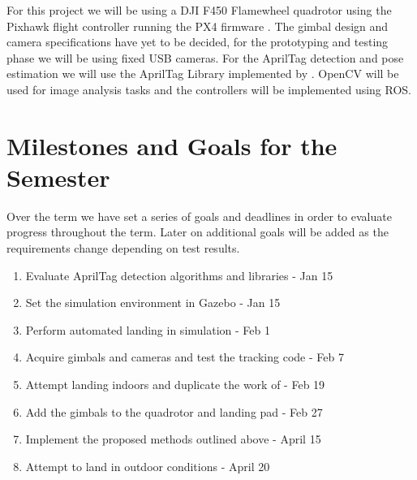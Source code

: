 \documentclass{article}[12pt]
\begin{document}
For this project we will be using a DJI F450 Flamewheel quadrotor using the Pixhawk flight controller \cite{pixhawk} running the PX4 firmware \cite{px4}. The gimbal design and camera specifications have yet to be decided, for the prototyping and testing phase we will be using fixed USB cameras. For the AprilTag detection and pose estimation we will use the AprilTag Library implemented by \cite{apriltags}. OpenCV will be used for image analysis tasks and the controllers will be implemented using ROS. 


\section*{Milestones and Goals for the Semester}
Over the term we have set a series of goals and deadlines in order to evaluate progress throughout the term. Later on additional goals will be added as the requirements change depending on test results.
\begin{enumerate}
	\item{Evaluate AprilTag detection algorithms and libraries - Jan 15}
	\item{Set the simulation environment in Gazebo - Jan 15} 
	\item{Perform automated landing in simulation - Feb 1}
	\item{Acquire gimbals and cameras and test the tracking code - Feb 7}
	\item{Attempt landing indoors and duplicate the work of \cite{Ling2014} - Feb 19}
	\item{Add the gimbals to the quadrotor and landing pad  - Feb 27}
	\item{Implement the proposed methods outlined above - April 15}
	\item{Attempt to land in outdoor conditions 	- April 20}
	
\end{enumerate}
\end{document}
